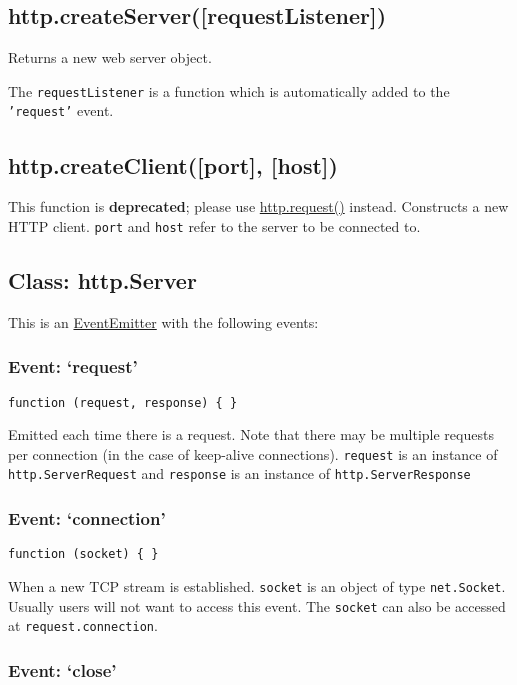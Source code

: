 \subsection{http.createServer({[}requestListener{]})}

Returns a new web server object.

The \texttt{requestListener} is a function which is automatically added
to the \texttt{'request'} event.

\subsection{http.createClient({[}port{]}, {[}host{]})}

This function is \textbf{deprecated}; please use
\hyperref[http\_http\_request\_options\_callback]{http.request()}
instead. Constructs a new HTTP client. \texttt{port} and \texttt{host}
refer to the server to be connected to.

\subsection{Class: http.Server}

This is an
\href{events.html\#events\_class\_events\_eventemitter}{EventEmitter}
with the following events:

\subsubsection{Event: `request'}

\texttt{function (request, response) \{ \}}

Emitted each time there is a request. Note that there may be multiple
requests per connection (in the case of keep-alive connections).
\texttt{request} is an instance of \texttt{http.ServerRequest} and
\texttt{response} is an instance of \texttt{http.ServerResponse}

\subsubsection{Event: `connection'}

\texttt{function (socket) \{ \}}

When a new TCP stream is established. \texttt{socket} is an object of
type \texttt{net.Socket}. Usually users will not want to access this
event. The \texttt{socket} can also be accessed at
\texttt{request.connection}.

\subsubsection{Event: `close'}

